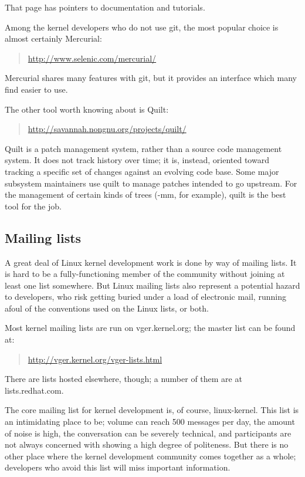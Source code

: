 \documentclass[a4paper,8pt,english]{sphinxmanual}
\begin{document}
That page has pointers to documentation and tutorials.

Among the kernel developers who do not use git, the most popular choice is
almost certainly Mercurial:
\begin{quote}

\href{http://www.selenic.com/mercurial/}{http://www.selenic.com/mercurial/}
\end{quote}

Mercurial shares many features with git, but it provides an interface which
many find easier to use.

The other tool worth knowing about is Quilt:
\begin{quote}

\href{http://savannah.nongnu.org/projects/quilt/}{http://savannah.nongnu.org/projects/quilt/}
\end{quote}

Quilt is a patch management system, rather than a source code management
system.  It does not track history over time; it is, instead, oriented
toward tracking a specific set of changes against an evolving code base.
Some major subsystem maintainers use quilt to manage patches intended to go
upstream.  For the management of certain kinds of trees (-mm, for example),
quilt is the best tool for the job.


\subsection{Mailing lists}
\label{process/2.Process:mailing-lists}
A great deal of Linux kernel development work is done by way of mailing
lists.  It is hard to be a fully-functioning member of the community
without joining at least one list somewhere.  But Linux mailing lists also
represent a potential hazard to developers, who risk getting buried under a
load of electronic mail, running afoul of the conventions used on the Linux
lists, or both.

Most kernel mailing lists are run on vger.kernel.org; the master list can
be found at:
\begin{quote}

\href{http://vger.kernel.org/vger-lists.html}{http://vger.kernel.org/vger-lists.html}
\end{quote}

There are lists hosted elsewhere, though; a number of them are at
lists.redhat.com.

The core mailing list for kernel development is, of course, linux-kernel.
This list is an intimidating place to be; volume can reach 500 messages per
day, the amount of noise is high, the conversation can be severely
technical, and participants are not always concerned with showing a high
degree of politeness.  But there is no other place where the kernel
development community comes together as a whole; developers who avoid this
list will miss important information.
\end{document}

